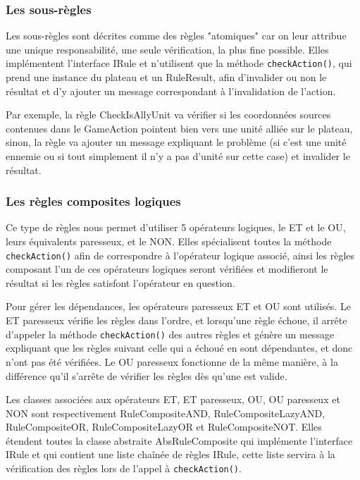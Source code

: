 \documentclass[a4paper]{report}
\begin{document}
\subsubsection{Les sous-règles}
Les sous-règles sont décrites comme des règles "atomiques" car on leur attribue une unique responsabilité, une seule vérification, la plus fine possible. Elles implémentent l'interface IRule et n'utilisent que la méthode {\tt checkAction()}, qui prend une instance du plateau et un RuleResult, afin d'invalider ou non le résultat et d'y ajouter un message correspondant à l'invalidation de l'action.

Par exemple, la règle CheckIsAllyUnit va vérifier si les coordonnées sources contenues dans le GameAction pointent bien vers une unité alliée sur le plateau, sinon, la règle va ajouter un message expliquant le problème (si c'est une unité ennemie ou si tout simplement il n'y a pas d'unité sur cette case) et invalider le résultat. 


\subsubsection{Les règles composites logiques}\label{sssec:composites}

Ce type de règles nous permet d'utiliser 5 opérateurs logiques, le ET et le OU, leurs équivalents paresseux, et le NON. Elles spécialisent toutes la méthode {\tt checkAction()} afin de correspondre à l'opérateur logique associé, ainsi les règles composant l'un de ces opérateurs logiques seront vérifiées et modifieront le résultat si les règles satisfont l'opérateur en question.

Pour gérer les dépendances, les opérateurs paresseux ET et OU sont utilisés. Le ET paresseux vérifie les règles dans l'ordre, et lorsqu'une règle échoue, il arrête d'appeler la méthode {\tt checkAction()} des autres règles et génère un message expliquant que les règles suivant celle qui a échoué en sont dépendantes, et donc n'ont pas été vérifiées. Le OU paresseux fonctionne de la même manière, à la différence qu'il s'arrête de vérifier les règles dès qu'une est valide.

Les classes associées aux opérateurs ET, ET paresseux, OU, OU paresseux et NON sont respectivement RuleCompositeAND, RuleCompositeLazyAND, RuleCompositeOR, RuleCompositeLazyOR et RuleCompositeNOT. Elles étendent toutes la classe abstraite AbsRuleComposite qui implémente l'interface IRule et qui contient une liste chaînée de règles IRule, cette liste servira à la vérification des règles lors de l'appel à {\tt checkAction()}.
\end{document}

